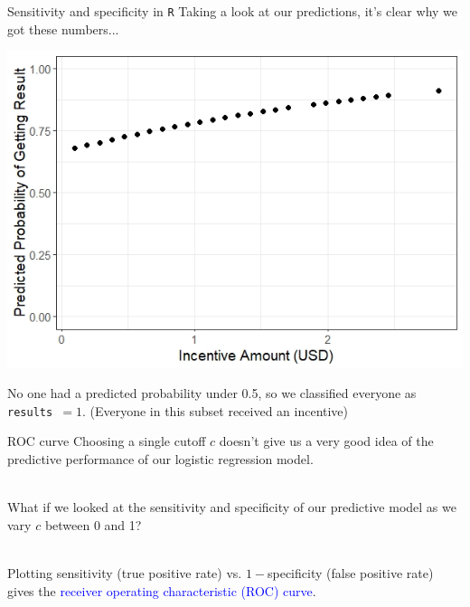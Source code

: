 \documentclass[10pt,t]{beamer}
\begin{document}
\begin{frame}{Sensitivity and specificity in \texttt{R}}
	\vspace{-0.5cm}
	Taking a look at our predictions, it's clear why we got these numbers...
			\begin{center}
		\includegraphics[scale = 0.5]{figs/hiv_prediction_plot}
	\end{center}
	No one had a predicted probability under 0.5, so we classified everyone as \texttt{results }$ = 1$. (Everyone in this subset received an incentive)
\end{frame}

\begin{frame}{ROC curve}
	Choosing a single cutoff $c$ doesn't give us a very good idea of the predictive performance of our logistic regression model. 
	\\ ~\
	
	What if we looked at the sensitivity and specificity of our predictive model as we vary $c$ between 0 and 1? 
	\\ ~\ 
	
	Plotting sensitivity (true positive rate) vs. $1-$specificity (false positive rate) gives the \textcolor{blue}{receiver operating characteristic (ROC) curve}. 
\end{frame}
\end{document}
